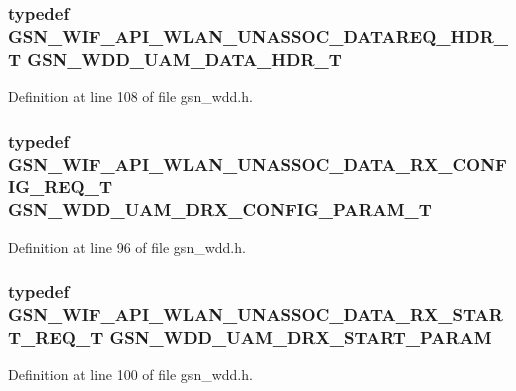 \hypertarget{a00603_a546688b4be1df3aa4ddbf6a63db0d3d5}{
\subsubsection[{GSN\_\-WDD\_\-UAM\_\-DATA\_\-HDR\_\-T}]{\setlength{\rightskip}{0pt plus 5cm}typedef {\bf GSN\_\-WIF\_\-API\_\-WLAN\_\-UNASSOC\_\-DATAREQ\_\-HDR\_\-T} {\bf GSN\_\-WDD\_\-UAM\_\-DATA\_\-HDR\_\-T}}}
\label{a00603_a546688b4be1df3aa4ddbf6a63db0d3d5}


Definition at line 108 of file gsn\_\-wdd.h.

\hypertarget{a00603_a556da70b3c2eaafd2f4893880bd4466a}{
\subsubsection[{GSN\_\-WDD\_\-UAM\_\-DRX\_\-CONFIG\_\-PARAM\_\-T}]{\setlength{\rightskip}{0pt plus 5cm}typedef {\bf GSN\_\-WIF\_\-API\_\-WLAN\_\-UNASSOC\_\-DATA\_\-RX\_\-CONFIG\_\-REQ\_\-T} {\bf GSN\_\-WDD\_\-UAM\_\-DRX\_\-CONFIG\_\-PARAM\_\-T}}}
\label{a00603_a556da70b3c2eaafd2f4893880bd4466a}


Definition at line 96 of file gsn\_\-wdd.h.

\hypertarget{a00603_a898a4dd61cb26c0d7b242632369c8585}{
\subsubsection[{GSN\_\-WDD\_\-UAM\_\-DRX\_\-START\_\-PARAM}]{\setlength{\rightskip}{0pt plus 5cm}typedef {\bf GSN\_\-WIF\_\-API\_\-WLAN\_\-UNASSOC\_\-DATA\_\-RX\_\-START\_\-REQ\_\-T} {\bf GSN\_\-WDD\_\-UAM\_\-DRX\_\-START\_\-PARAM}}}
\label{a00603_a898a4dd61cb26c0d7b242632369c8585}


Definition at line 100 of file gsn\_\-wdd.h.

